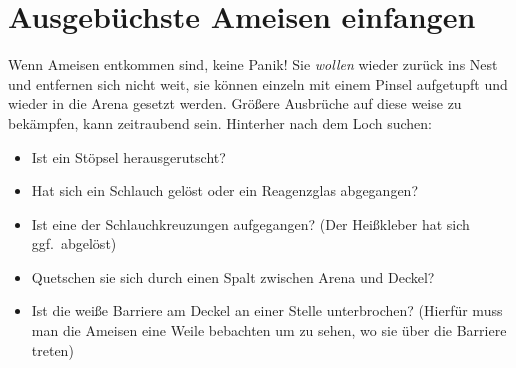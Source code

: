\section{Ausgebüchste Ameisen einfangen}
Wenn Ameisen entkommen sind, keine Panik! Sie \textit{wollen} wieder zurück ins Nest und entfernen sich nicht weit,
sie können einzeln mit einem Pinsel aufgetupft und wieder in die Arena gesetzt werden.
Größere Ausbrüche auf diese weise zu bekämpfen, kann zeitraubend sein.
Hinterher nach dem Loch suchen:
\begin{itemize}
  \item Ist ein Stöpsel herausgerutscht?
  \item Hat sich ein Schlauch gelöst oder ein Reagenzglas abgegangen?
  \item Ist eine der Schlauchkreuzungen aufgegangen? (Der Heißkleber hat sich ggf.\ abgelöst)
  \item Quetschen sie sich durch einen Spalt zwischen Arena und Deckel?
  \item Ist die weiße Barriere am Deckel an einer Stelle unterbrochen?
        (Hierfür muss man die Ameisen eine Weile bebachten um zu sehen, wo sie über die Barriere treten)
\end{itemize}
